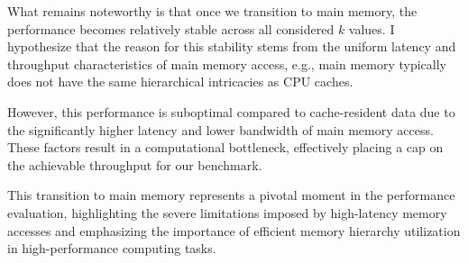 \documentclass{article}
\begin{document}
What remains noteworthy is that once we transition to main memory, the performance becomes relatively stable across all considered \( k \) values. I hypothesize that the reason for this stability stems from the uniform latency and throughput characteristics of main memory access, e.g., main memory typically does not have the same hierarchical intricacies as CPU caches. 

However, this performance is suboptimal compared to cache-resident data due to the significantly higher latency and lower bandwidth of main memory access. These factors result in a computational bottleneck, effectively placing a cap on the achievable throughput for our benchmark.

This transition to main memory represents a pivotal moment in the performance evaluation, highlighting the severe limitations imposed by high-latency memory accesses and emphasizing the importance of efficient memory hierarchy utilization in high-performance computing tasks.
\end{document}
